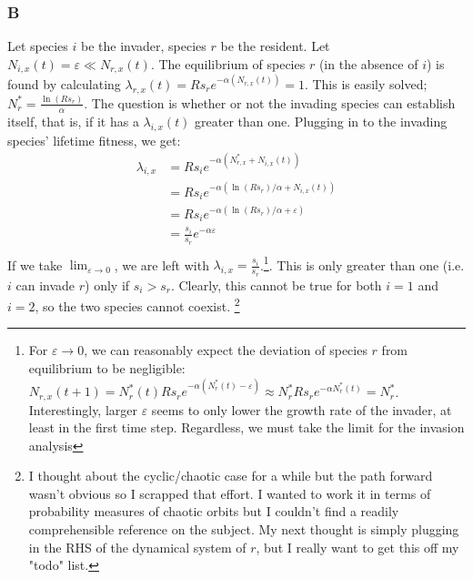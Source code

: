 \documentclass[11pt]{amsart}
\begin{document}
\subsubsection*{B}
Let species $i$ be the invader, species $r$ be the resident.  Let $N_{i,x}(t) = \varepsilon \ll N_{r,x}(t)$.  The equilibrium of species $r$ (in the absence of $i$) is found by calculating $\lambda_{r,x}(t) = Rs_re^{-\alpha(N_{r,x}(t))} = 1$.  This is easily solved; $N_r^* = \frac{\ln(Rs_r)}{\alpha}$.  The question is whether or not the invading species can establish itself, that is, if it has a $\lambda_{i,x}(t)$ greater than one.  Plugging in to the invading species' lifetime fitness, we get:
\begin{align*}
\lambda_{i,x} &= Rs_ie^{-\alpha(N_{r,x}^* + N_{i,x}(t))}\\
&= Rs_ie^{-\alpha(\ln(Rs_r)/\alpha + N_{i,x}(t))}\\
&= Rs_ie^{-\alpha(\ln(Rs_r)/\alpha+ \varepsilon)}\\
&= \frac{s_i}{s_r}e^{-\alpha\varepsilon}\\
\end{align*}
If we take $\lim_{\varepsilon\to0}$, we are left with $\lambda_{i,x}=\frac{s_i}{s_r}$.\footnote{For $\varepsilon\to0$, we can reasonably expect the deviation of species $r$ from equilibrium to be negligible: $N_{r,x}(t+1) =   N_{r}^*(t)Rs_re^{-\alpha(N_r^*(t)-\varepsilon)} \approx N_{r}^*Rs_re^{-\alpha N_{r}^*(t)}=N_r^*$.  Interestingly, larger $\varepsilon$ seems to only lower the growth rate of the invader, at least in the first time step.  Regardless, we must take the limit for the invasion analysis}.    This is only greater than one (i.e. $i$ can invade $r$) only if $s_i>s_r$.  Clearly, this cannot be true for both $i=1$ and $i=2$, so the two species cannot coexist.  \footnote{I thought about the cyclic/chaotic case for a while but the path forward wasn't obvious so I scrapped that effort.  I wanted to work it in terms of probability measures of chaotic orbits but I couldn't find a readily comprehensible reference on the subject.  My next thought is simply plugging in the RHS of the dynamical system of $r$, but I really want to get this off my "todo" list.}
\end{document}
